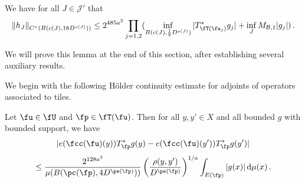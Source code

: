     \begin{lemma}
        \label{Holder-correlation-tree}
        \leanok
        We have for all $J \in \mathcal{J}'$ that
      \begin{equation}
            \label{hHolder}
            \|h_J\|_{C^{\tau}(B(c(J), 16D^{s(J)}))} \le 2^{485a^3} \prod_{j = 1,2} (\inf_{B(c(J), \frac{1}{8}D^{s(J)})} |T_{\fT(\fu_j)}^* g_j| + \inf_J M_{\mathcal{B}, 1} |g_j|)\,.
        \end{equation}
    \end{lemma}

    We will prove this lemma at the end of this section, after establishing several auxiliary results.

    We begin with the following H\"older continuity estimate for adjoints of operators associated to tiles.
    \begin{lemma}
        \label{Holder-correlation-tile}
        \leanok
        Let $\fu \in \fU$ and $\fp \in \fT(\fu)$. Then for all $y, y' \in X$ and all bounded $g$ with bounded support, we have
        $$
            |e(\fcc(\fu)(y)) T_{\fp}^* g(y) - e(\fcc(\fu)(y')) T_{\fp}^* g(y')|
        $$
      \begin{equation}
            \label{T*Holder2}
            \le \frac{2^{128a^3}}{\mu(B(\pc(\fp), 4D^{\ps(\fp)}))} \left(\frac{\rho(y, y')}{D^{\ps(\fp)}}\right)^{1/a} \int_{E(\fp)} |g(x)| \, \mathrm{d}\mu(x)\,.
        \end{equation}
    \end{lemma}

